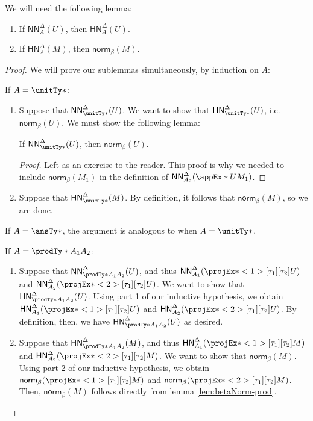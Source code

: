 \documentclass[letterpaper]{article}
\newcommand{\De}[0]{\Delta}
\newcommand{\betaNorm}[1]{\mathsf{norm}_\beta(#1)}
\newcommand{\HN}[3]{\mathsf{HN}^{#1}_{#2}(#3)}
\newcommand{\NN}[3]{\mathsf{NN}^{#1}_{#2}(#3)}
\begin{document}
We will need the following lemma:
\begin{lemma}\label{lem:pdd}
\hspace{0pt}
\begin{enumerate}
  \item If $\NN{\De}{A}{U}$, then $\HN{\De}{A}{U}$.
  \item If $\HN{\De}{A}{M}$, then $\betaNorm{M}$.
\end{enumerate}
\end{lemma}
\begin{proof}
We will prove our sublemmas simultaneously, by induction on $A$:

If $A = \unitTy*$:
\begin{enumerate}
  \item Suppose that $\NN{\De}{\unitTy*}{U}$. We want to show that
    $\HN{\De}{\unitTy*}{U}$, i.e.\ $\betaNorm{U}$. We must show the following
    lemma:
    \begin{lemma}
    If $\NN{\De}{\unitTy*}{U}$, then $\betaNorm{U}$.
    \end{lemma}
    \begin{proof}
    Left as an exercise to the reader. This proof is why we needed
      to include $\betaNorm{M_1}$ in the definition of
      $\NN{\De}{A_2}{\appEx*{U}{M_1}}$.
    \end{proof}

  \item Suppose that $\HN{\De}{\unitTy*}{M}$. By definition, it follows that
    $\betaNorm{M}$, so we are done.
\end{enumerate}

If $A = \ansTy*$, the argument is analogous to when $A = \unitTy*$.

If $A = \prodTy*{A_1}{A_2}$:
\begin{enumerate}
  \item Suppose that $\NN{\De}{\prodTy*{A_1}{A_2}}{U}$, and thus
    $\NN{\De}{A_1}{\fstEx*{U}}$ and $\NN{\De}{A_2}{\sndEx*{U}}$. We want to show that
    $\HN{\De}{\prodTy*{A_1}{A_2}}{U}$. Using part 1 of our inductive
    hypothesis, we obtain $\HN{\De}{A_1}{\fstEx*{U}}$ and
    $\HN{\De}{A_2}{\sndEx*{U}}$. By definition, then, we have
    $\HN{\De}{\prodTy*{A_1}{A_2}}{U}$ as desired.

  \item Suppose that $\HN{\De}{\prodTy*{A_1}{A_2}}{M}$, and thus
    $\HN{\De}{A_1}{\fstEx*{M}}$ and $\HN{\De}{A_2}{\sndEx*{M}}$. We want to show
    that $\betaNorm{M}$. Using
    part 2 of our inductive hypothesis, we obtain
    $\betaNorm{\fstEx*{M}}$ and $\betaNorm{\sndEx*{M}}$. Then, $\betaNorm{M}$
    follows directly from lemma \ref{lem:betaNorm-prod}.
\end{enumerate}


\end{proof}
\end{document}
